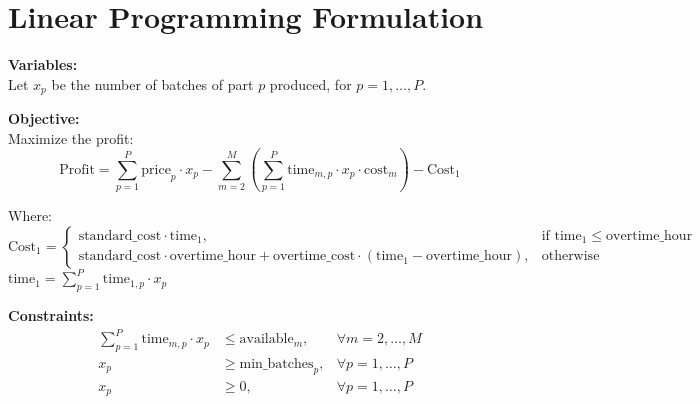 \documentclass{article}
\begin{document}
\section*{Linear Programming Formulation}

\textbf{Variables:} \\
Let \( x_p \) be the number of batches of part \( p \) produced, for \( p = 1, \ldots, P \).

\textbf{Objective:} \\
Maximize the profit:
\[
\text{Profit} = \sum_{p=1}^{P} \text{price}_p \cdot x_p - \sum_{m=2}^{M} \left( \sum_{p=1}^{P} \text{time}_{m,p} \cdot x_p \cdot \text{cost}_{m} \right) - \text{Cost}_1
\]

Where:
\[
\text{Cost}_1 = \begin{cases} 
\text{standard\_cost} \cdot \text{time}_1, & \text{if } \text{time}_1 \leq \text{overtime\_hour} \\
\text{standard\_cost} \cdot \text{overtime\_hour} + \text{overtime\_cost} \cdot (\text{time}_1 - \text{overtime\_hour}), & \text{otherwise}
\end{cases}
\]
\(\text{time}_1 = \sum_{p=1}^{P} \text{time}_{1,p} \cdot x_p\)

\textbf{Constraints:}
\begin{align*}
\sum_{p=1}^{P} \text{time}_{m,p} \cdot x_p & \leq \text{available}_m, & \forall m = 2, \ldots, M \\
x_p & \geq \text{min\_batches}_p, & \forall p = 1, \ldots, P \\
x_p & \geq 0, & \forall p = 1, \ldots, P
\end{align*}
\end{document}
